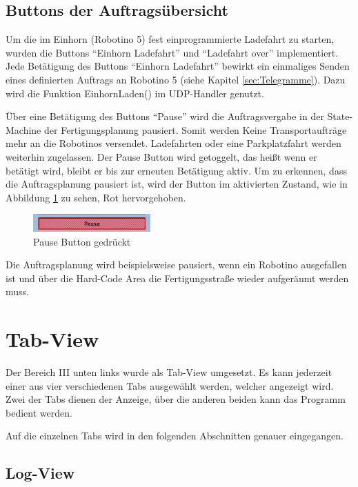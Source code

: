 \subsection{Buttons der Auftragsübersicht}

Um die im Einhorn (Robotino 5) fest einprogrammierte Ladefahrt zu starten, wurden die Buttons "`Einhorn Ladefahrt"' und "`Ladefahrt over"' implementiert. Jede Betätigung des Buttons  "`Einhorn Ladefahrt"' bewirkt ein einmaliges Senden eines definierten Auftrags an Robotino 5 (siehe Kapitel \ref{sec:Telegramme}). Dazu wird die Funktion EinhornLaden() im UDP-Handler genutzt. 
 
Über eine Betätigung des Buttons "`Pause"' wird die Auftragsvergabe in der State-Machine der Fertigungsplanung pausiert. Somit werden Keine Transportaufträge mehr an die Robotinos versendet. Ladefahrten oder eine Parkplatzfahrt werden weiterhin zugelassen. Der Pause Button wird getoggelt, das heißt wenn er betätigt wird, bleibt er bis zur erneuten Betätigung aktiv. Um zu erkennen, dass die Auftragsplanung pausiert ist, wird der Button im aktivierten Zustand, wie in Abbildung \ref{fig:Pause} zu sehen, Rot hervorgehoben.

\begin{figure}[htb]
    \centering
    \includegraphics[width=0.4\textwidth]{Abbildungen/Pause.png}
    \caption{Pause Button gedrückt}		
    \label{fig:Pause}
\end{figure}

Die Auftragsplanung wird beispielsweise pausiert, wenn ein Robotino ausgefallen ist und über die Hard-Code Area die Fertigungsstraße wieder aufgeräumt werden muss. 

\section{Tab-View}

Der Bereich III unten links wurde als Tab-View umgesetzt. Es kann jederzeit einer aus vier verschiedenen Tabs ausgewählt werden, welcher angezeigt wird. Zwei der Tabs dienen der Anzeige, über die anderen beiden kann das Programm bedient werden. 

Auf die einzelnen Tabs wird in den folgenden Abschnitten genauer eingegangen. 

\subsection{Log-View}

